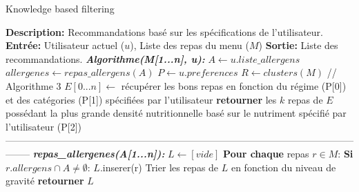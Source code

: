 \documentclass[11pt]{article}
\begin{document}
\begin{algorithm}
    \caption{Knowledge based filtering}
    \begin{algorithmic}[1]
        \Statex \textbf{Description:} Recommandations basé sur les spécifications de l'utilisateur.
        \Statex \textbf{Entrée:} Utilisateur actuel ($u$), Liste des repas du menu ($M$)
        \Statex \textbf{Sortie:} Liste des recommandations.
        \State \textbf{\textit{Algorithme(M[1...n], u):}}
        \State \hspace{0.5cm} $A \leftarrow u.liste\_allergens$
        \State \hspace{0.5cm} $allergenes \leftarrow repas\_allergens(A)$
        \State \hspace{0.5cm} $P \leftarrow u.preferences$
        \State \hspace{0.5cm} $R \leftarrow clusters(M)$ // Algorithme 3
        \State \hspace{0.5cm} $E[0...n] \leftarrow$ récupérer les bons repas en fonction du régime (P[0]) et des
        \State \hspace{0.5cm} catégories (P[1]) spécifiées par l'utilisateur
        \State \hspace{0.5cm} \textbf{retourner} les $k$ repas de $E$ possédant la plus grande densité nutritionnelle basé sur
        \State \hspace{0.5cm} le nutriment spécifié par l'utilisateur (P[2])\\
--------------------------------------------------------------------------------------------------------------------
        \State \textbf{\textit{repas\_allergenes(A[1...n]):}}
        \State \hspace{0.5cm} $L \leftarrow [vide]$
        \State \hspace{0.5cm} \textbf{Pour chaque} repas $r\in M$:
        \State \hspace{1cm} \textbf{Si} $r.allergens \cap A \neq \emptyset$:
        \State \hspace{1.5cm} $L$.inserer(r)
        \State \hspace{0.5cm} Trier les repas de $L$ en fonction du niveau de gravité
        \State \hspace{0.5cm} \textbf{retourner} $L$
    \end{algorithmic}
\end{algorithm}
\end{document}
